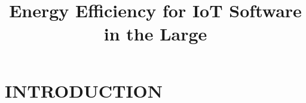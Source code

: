 \documentclass[12pt,english]{amsart}
\title{Energy Efficiency for IoT Software in the Large
        } %
\begin{document}
\date{}
\maketitle

\vspace{-0.5cm}

\section{INTRODUCTION}
\label{sec.introduction}
\end{document}
